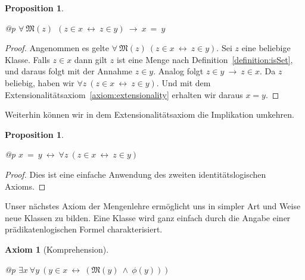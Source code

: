 \documentclass[a4paper,german,10pt,twoside]{book}
\newtheorem{prop}[thm]{Proposition}
\newtheorem{ax}{Axiom}
\theoremstyle{definition}
\theoremstyle{remark}
\begin{document}
\begin{prop}
\label{theorem:extensionalitySetRestricted} \hypertarget{theorem:extensionalitySetRestricted}{}
\mbox{}
\begin{longtable}{{@{\extracolsep{\fill}}p{\linewidth}}}
\centering $\forall \ \mathfrak{M}(z)\ \ (z \in x\ \leftrightarrow \ z \in y)\ \rightarrow \ x \ =  \ y$
\end{longtable}

\end{prop}
\begin{proof}
Angenommen es gelte $\forall \ \mathfrak{M}(z) \ ( z \in x \ \leftrightarrow \ z \in y)$. Sei $z$ eine beliebige Klasse. Falls $z \in x$ dann gilt $z$ ist eine Menge nach Definition~\ref{definition:isSet}, und daraus folgt mit der Annahme $z \in y$. Analog folgt $z \in y \ \rightarrow \ z \in x$. Da $z$ beliebig, haben wir $\forall z \ (z \in x \ \leftrightarrow \ z \in y)$. Und mit dem  Extensionalit{\"a}tsaxiom~\ref{axiom:extensionality} erhalten wir daraus $x = y$.
\end{proof}




\par
Weiterhin k{\"o}nnen wir in dem Extensionalit{\"a}tsaxiom die Implikation umkehren.

\begin{prop}
\label{theorem:extensonalityEquivalence} \hypertarget{theorem:extensonalityEquivalence}{}
\mbox{}
\begin{longtable}{{@{\extracolsep{\fill}}p{\linewidth}}}
\centering $x \ =  \ y\ \leftrightarrow \ \forall z\ (z \in x\ \leftrightarrow \ z \in y)$
\end{longtable}

\end{prop}
\begin{proof}
Dies ist eine einfache Anwendung des zweiten identit{\"a}tslogischen Axioms.
\end{proof}




\par
Unser n{\"a}chstes Axiom der Mengenlehre erm{\"o}glicht uns in simpler Art und Weise neue Klassen zu bilden. Eine Klasse wird ganz einfach durch die Angabe einer pr{\"a}dikatenlogischen Formel charakterisiert.

\begin{ax}[Komprehension]
\label{axiom:comprehension} \hypertarget{axiom:comprehension}{}
\mbox{}
\begin{longtable}{{@{\extracolsep{\fill}}p{\linewidth}}}
\centering $\exists x\ \forall y\ (y \in x\ \leftrightarrow \ (\mathfrak{M}(y)\ \land \ \phi(y)))$
\end{longtable}

\end{ax}
\end{document}
